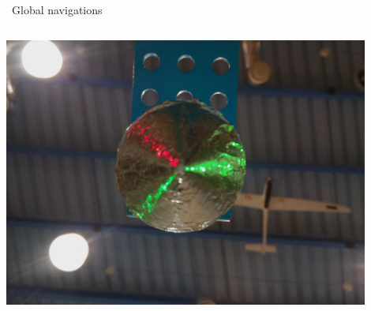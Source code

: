 \documentclass{beamer}
\begin{document}
\begin{frame}{\quad \quad ~Global navigations}
\begin{columns}
\begin{column}{0.49\textwidth}
\newline{}
\includegraphics[width = 0.9\textwidth]{Pictures/TestNav}
\end{column}
\end{columns}
\end{frame}
\end{document}
